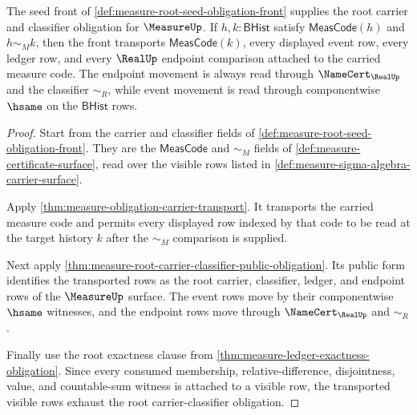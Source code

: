 \begin{theorem}
\label{thm:measure-root-seed-carrier-classifier-obligation}
The seed front of \autoref{def:measure-root-seed-obligation-front} supplies
the root carrier and classifier obligation for $\MeasureUp$. If
$h,k:\mathsf{BHist}$ satisfy $\mathsf{MeasCode}(h)$ and $h\sim_M k$, then the
front transports $\mathsf{MeasCode}(k)$, every displayed event row, every
ledger row, and every $\RealUp$ endpoint comparison attached to the carried
measure code. The endpoint movement is always read through
$\NameCert_{\RealUp}$ and the classifier $\sim_R$, while event movement is
read through componentwise $\hsame$ on the $\mathsf{BHist}$ rows.
\end{theorem}
\begin{proof}
Start from the carrier and classifier fields of
\autoref{def:measure-root-seed-obligation-front}. They are the
$\mathsf{MeasCode}$ and $\sim_M$ fields of
\autoref{def:measure-certificate-surface}, read over the visible rows listed
in \autoref{def:measure-sigma-algebra-carrier-surface}.

Apply \autoref{thm:measure-obligation-carrier-transport}. It transports the
carried measure code and permits every displayed row indexed by that code to
be read at the target history $k$ after the $\sim_M$ comparison is supplied.

Next apply \autoref{thm:measure-root-carrier-classifier-public-obligation}.
Its public form identifies the transported rows as the root carrier,
classifier, ledger, and endpoint rows of the $\MeasureUp$ surface. The event
rows move by their componentwise $\hsame$ witnesses, and the endpoint rows
move through $\NameCert_{\RealUp}$ and $\sim_R$.

Finally use the root exactness clause from
\autoref{thm:measure-ledger-exactness-obligation}. Since every consumed
membership, relative-difference, disjointness, value, and countable-sum
witness is attached to a visible row, the transported visible rows exhaust the
root carrier-classifier obligation.
\end{proof}

